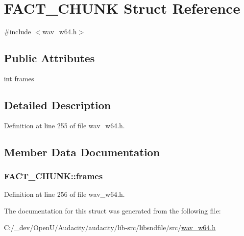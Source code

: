 \hypertarget{struct_f_a_c_t___c_h_u_n_k}{}\section{F\+A\+C\+T\+\_\+\+C\+H\+U\+NK Struct Reference}
\label{struct_f_a_c_t___c_h_u_n_k}


{\ttfamily \#include $<$wav\+\_\+w64.\+h$>$}

\subsection*{Public Attributes}
\begin{DoxyCompactItemize}
\item 
\hyperlink{xmltok_8h_a5a0d4a5641ce434f1d23533f2b2e6653}{int} \hyperlink{struct_f_a_c_t___c_h_u_n_k_afc67f307c512b8dcfe56f9d3624bc051}{frames}
\end{DoxyCompactItemize}


\subsection{Detailed Description}


Definition at line 255 of file wav\+\_\+w64.\+h.



\subsection{Member Data Documentation}
\subsubsection[{\texorpdfstring{frames}{frames}}]{ F\+A\+C\+T\+\_\+\+C\+H\+U\+N\+K\+::frames}\hypertarget{struct_f_a_c_t___c_h_u_n_k_afc67f307c512b8dcfe56f9d3624bc051}{}\label{struct_f_a_c_t___c_h_u_n_k_afc67f307c512b8dcfe56f9d3624bc051}


Definition at line 256 of file wav\+\_\+w64.\+h.



The documentation for this struct was generated from the following file\+:\begin{DoxyCompactItemize}
\item 
C\+:/\+\_\+dev/\+Open\+U/\+Audacity/audacity/lib-\/src/libsndfile/src/\hyperlink{wav__w64_8h}{wav\+\_\+w64.\+h}\end{DoxyCompactItemize}
